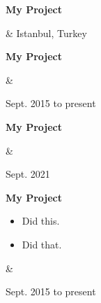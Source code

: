 \documentclass[10pt, letterpaper]{article}
\newenvironment{highlights}{
        \begin{itemize}[
                topsep=0pt,
                parsep=0.10 cm,
                partopsep=0pt,
                itemsep=0pt,
                after=\relax,
                leftmargin=0.4 cm + 3pt
            ]
    }{
        \end{itemize}
    } %
\let\originalTabularx\tabularx
\let\originalEndTabularx\endtabularx
\renewenvironment{tabularx}{\bgroup\centering\originalTabularx}{\originalEndTabularx\par\egroup}
\begin{document}
        \vspace{0.2 cm}
        \begin{tabularx}{
            \textwidth-0.4 cm-0.13cm
        }{
            K{0.2 cm}
            R{4.1 cm}
        }
            \textbf{My Project}

            \vspace{0.10 cm}

            &
            Istanbul, Turkey

            
        \end{tabularx}


        \vspace{0.2 cm}
        \begin{tabularx}{
            \textwidth-0.4 cm-0.13cm
        }{
            K{0.2 cm}
            R{4.1 cm}
        }
            \textbf{My Project}

            \vspace{0.10 cm}

            &
            

            Sept. 2015 to present
        \end{tabularx}


        \vspace{0.2 cm}
        \begin{tabularx}{
            \textwidth-0.4 cm-0.13cm
        }{
            K{0.2 cm}
            R{4.1 cm}
        }
            \textbf{My Project}

            \vspace{0.10 cm}

            &
            

            Sept. 2021
        \end{tabularx}


        \vspace{0.2 cm}
        \begin{tabularx}{
            \textwidth-0.4 cm-0.13cm
        }{
            K{0.2 cm}
            R{4.1 cm}
        }
            \textbf{My Project}

            \vspace{0.10 cm}

            \begin{highlights}
                \item Did this.
                \item Did that.
            \end{highlights}
            &
            

            Sept. 2015 to present
        \end{tabularx}
\end{document}
